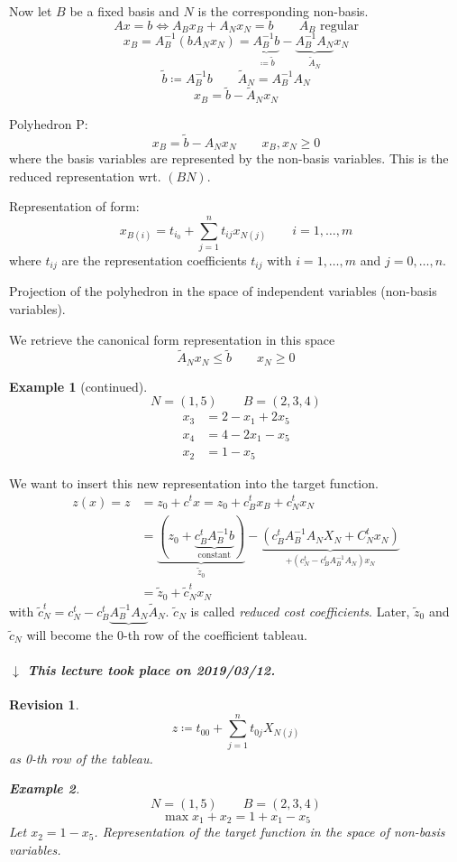 \documentclass[a4paper]{article}
\numberwithin{lecref}{section}
\newtheorem*{Example}{Example}
\newtheorem*{Revision}{Revision}
\newcommand{\dateref}[1]{%
  \begin{mdframed}[backgroundcolor=gray!10,innerbottommargin=0pt,innertopmargin=0pt]
    \paragraph{\textit{$\downarrow$ This lecture took place on #1.}}%
  \end{mdframed}%
}
\begin{document}
Now let $B$ be a fixed basis and $N$ is the corresponding non-basis.
\[ Ax = b \iff A_B x_B + A_N x_N = b \qquad A_B \text{ regular} \]
\[ x_B = A_B^{-1} (b  A_N x_N) = \underbrace{A_B^{-1} b}_{\coloneqq \tilde b} - \underbrace{A_B^{-1} A_N}_{\tilde A_N} x_N \]
\[ \tilde b \coloneqq A_B^{-1} b \qquad \tilde A_N = A_B^{-1} A_N \]
\[ x_B = \tilde b - \tilde A_N x_N \]

Polyhedron P:
\[ x_B = \tilde b - A_N x_N \qquad x_B, x_N \geq 0 \]
where the basis variables are represented by the non-basis variables.
This is the reduced representation wrt. $(BN)$.

Representation of form:
\[ x_{B(i)} = t_{i_0} + \sum_{j=1}^n t_{ij} x_{N(j)} \qquad i = 1, \dots, m \]
where $t_{ij}$ are the representation coefficients $t_{ij}$ with $i = 1, \dots, m$ and $j = 0, \dots, n$.

Projection of the polyhedron in the space of independent variables (non-basis variables).

We retrieve the canonical form representation in this space
\[ \tilde A_N x_N \leq \tilde b \qquad x_N \geq 0 \]

\begin{Example}[continued]
	\[ N = (1, 5) \qquad B = (2, 3, 4) \]
	\begin{align*}
		x_3 &= 2 - x_1 + 2 x_5 \\
		x_4 &= 4 - 2x_1 - x_5 \\
		x_2 &= 1 - x_5
	\end{align*}
\end{Example}

We want to insert this new representation into the target function.
\begin{align*}
	z(x) = z
		&= z_0 + c^t x = z_0 + c_B^t x_B + c_N^t x_N \\
		&= \underbrace{(z_0 + \underbrace{c_B^t A_B^{-1} b}_{\text{constant}})}_{\tilde z_0} - \underbrace{(c_B^t A_B^{-1} A_N X_N + C_N^t x_N)}_{+ (c_N^t - c_B^t A_B^{-1} A_N) x_N} \\
		&= \tilde z_0 + \tilde c_N^t x_N
\end{align*}
with $\tilde c_N^t = c_N^t - c_B^t \underbrace{A_B^{-1} A_N}{\tilde A_N}$. $\tilde c_N$ is called \emph{reduced cost coefficients}. Later, $\tilde z_0$ and $\tilde c_N$ will become the 0-th row of the coefficient tableau.

\dateref{2019/03/12}

\begin{Revision}
	\[ z \coloneqq t_{00} + \sum_{j=1}^n t_{0j} X_{N(j)} \]
	as 0-th row of the tableau.
	\begin{Example}
		\[ N = (1, 5) \qquad B = (2, 3, 4) \]
		\[ \max x_1 + x_2 = 1 + x_1 - x_5 \]
		Let $x_2 = 1 - x_5$.
		Representation of the target function in the space of non-basis variables.
	\end{Example}
\end{Revision}
\end{document}
